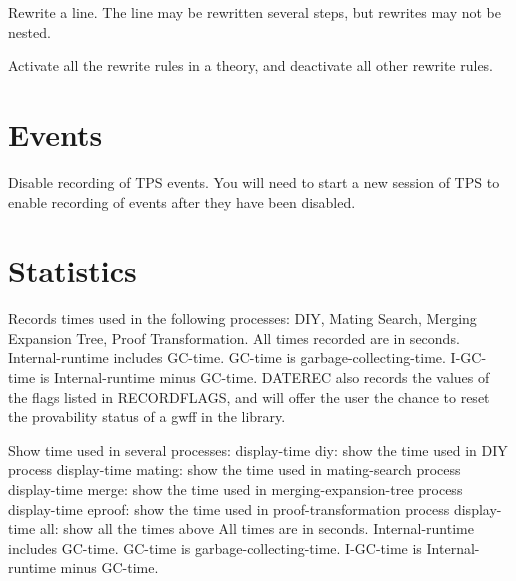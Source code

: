 \begin{description}
\item[\parbox{\textwidth}{USE-RRULES \textit{p2} \textit{p1} \textit{a} \textit{b} \textit{p2-hyps} \textit{p1-hyps}}]  
Rewrite a line. The line may be rewritten several steps,
but rewrites may not be nested.

\item[\parbox{\textwidth}{USE-THEORY \textit{theory}}]  
Activate all the rewrite rules in a theory, and
deactivate all other rewrite rules.
\item
\end{description}

\section{Events}

\begin{description} 
\item[\parbox{\textwidth}{DISABLE-EVENTS}]  
Disable recording of TPS events. You will need to start a new session
of TPS to enable recording of events after they have been disabled.
\item
\end{description}

\section{Statistics}

\begin{description} 
\item[\parbox{\textwidth}{DATEREC \textit{name} \textit{type} \textit{comment}}]  
Records times used in the following processes:
DIY, Mating Search, Merging Expansion Tree, Proof Transformation.
All times recorded are in seconds.
Internal-runtime includes GC-time.
GC-time is garbage-collecting-time.
I-GC-time is Internal-runtime minus GC-time.
DATEREC also records the values of the flags listed in RECORDFLAGS,
and will offer the user the chance to reset the provability 
status of a gwff in the library.

\item[\parbox{\textwidth}{DISPLAY-TIME \textit{name}}]  
Show time used in several processes:
display-time diy: show the time used in DIY process
display-time mating: show the time used in mating-search process
display-time merge: show the time used in merging-expansion-tree process
display-time eproof: show the time used in proof-transformation process
display-time all: show all the times above
All times are in seconds.
Internal-runtime includes GC-time.
GC-time is garbage-collecting-time.
I-GC-time is Internal-runtime minus GC-time.
\item
\end{description}

